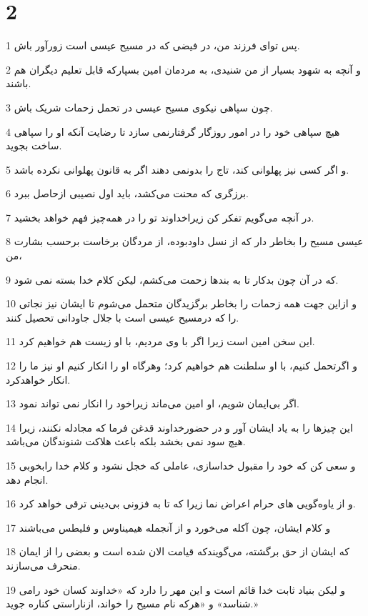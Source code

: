 \chapter{2}

\par 1 پس تو‌ای فرزند من، در فیضی که در مسیح عیسی است زورآور باش.
\par 2 و آنچه به شهود بسیار از من شنیدی، به مردمان امین بسپارکه قابل تعلیم دیگران هم باشند.
\par 3 چون سپاهی نیکوی مسیح عیسی در تحمل زحمات شریک باش.
\par 4 هیچ سپاهی خود را در امور روزگار گرفتارنمی سازد تا رضایت آنکه او را سپاهی ساخت بجوید.
\par 5 و اگر کسی نیز پهلوانی کند، تاج را بدونمی دهند اگر به قانون پهلوانی نکرده باشد.
\par 6 برزگری که محنت می‌کشد، باید اول نصیبی ازحاصل ببرد.
\par 7 در آنچه می‌گویم تفکر کن زیراخداوند تو را در همه‌چیز فهم خواهد بخشید.
\par 8 عیسی مسیح را بخاطر دار که از نسل داودبوده، از مردگان برخاست برحسب بشارت من،
\par 9 که در آن چون بدکار تا به بندها زحمت می‌کشم، لیکن کلام خدا بسته نمی شود.
\par 10 و ازاین جهت همه زحمات را بخاطر برگزیدگان متحمل می‌شوم تا ایشان نیز نجاتی را که درمسیح عیسی است با جلال جاودانی تحصیل کنند.
\par 11 این سخن امین است زیرا اگر با وی مردیم، با او زیست هم خواهیم کرد.
\par 12 و اگرتحمل کنیم، با او سلطنت هم خواهیم کرد؛ وهرگاه او را انکار کنیم او نیز ما را انکار خواهدکرد.
\par 13 اگر بی‌ایمان شویم، او امین می‌ماند زیراخود را انکار نمی تواند نمود.
\par 14 این چیزها را به یاد ایشان آور و در حضورخداوند قدغن فرما که مجادله نکنند، زیرا هیچ سود نمی بخشد بلکه باعث هلاکت شنوندگان می‌باشد.
\par 15 و سعی کن که خود را مقبول خداسازی، عاملی که خجل نشود و کلام خدا رابخوبی انجام دهد.
\par 16 و از یاوه‌گویی های حرام اعراض نما زیرا که تا به فزونی بی‌دینی ترقی خواهد کرد.
\par 17 و کلام ایشان، چون آکله می‌خورد و از آنجمله هیمیناوس و فلیطس می‌باشند
\par 18 که ایشان از حق برگشته، می‌گویندکه قیامت الان شده است و بعضی را از ایمان منحرف می‌سازند.
\par 19 و لیکن بنیاد ثابت خدا قائم است و این مهر را دارد که «خداوند کسان خود رامی شناسد» و «هرکه نام مسیح را خواند، ازناراستی کناره جوید.»
